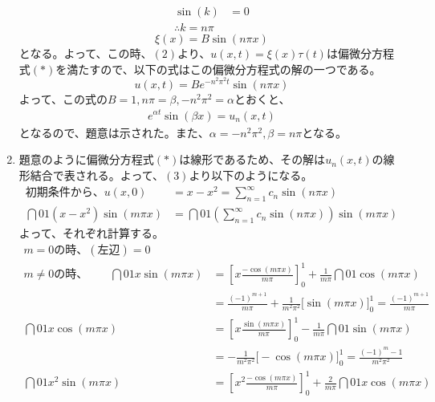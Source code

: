 \documentclass[dvipdfmx,titlepage, 11pt, a4paper]{jsarticle}%
\begin{document}
\begin{enumerate}[(1)]
        \begin{align*}
            \sin (k) &= 0\\
            \therefore k = n\pi
        \end{align*}
        \begin{equation*}
            \xi (x) = B\sin (n\pi x)
        \end{equation*}
        となる。よって、この時、$(2)$より、$u(x, t) = \xi (x)\tau (t)$は偏微分方程式$(*)$を満たすので、以下の式はこの偏微分方程式の解の一つである。
        \begin{equation*}
            u(x, t) = Be^{-n^2\pi^2t}\sin(n\pi x)
        \end{equation*}
        よって、この式の$B = 1, n\pi = \beta, -n^2\pi^2 = \alpha$とおくと、
        \begin{align*}
            e^{\alpha t}\sin(\beta x) = u_n(x, t)
        \end{align*}
        となるので、題意は示された。また、$\alpha = -n^2\pi^2, \beta = n\pi$となる。
    \item 題意のように偏微分方程式$(*)$は線形であるため、その解は$u_n(x, t)$の線形結合で表される。よって、$(3)$より以下のようになる。
    \begin{align*}
        初期条件から、u(x, 0) &= x - x^2 = \sum_{n = 1}^{\infty}c_n\sin(n\pi x)\\
        \dint{0}{1}{(x - x^2)\sin(m\pi x)} &= \dint{0}{1}{\left(\sum_{n = 1}^{\infty}c_n\sin(n\pi x)\right)\sin (m\pi x)}
    \end{align*}
    よって、それぞれ計算する。
    \begin{align*}
        m = 0の時、
        (左辺) = 0&\\
        m \neq 0の時、\qquad
        \dint{0}{1}{x\sin(m\pi x)} &= \left[x\frac{-\cos(m\pi x)}{m\pi}\right]_{0}^{1} + \frac{1}{m\pi}\dint{0}{1}{\cos(m\pi x)}\\
        &= \frac{(-1)^{m + 1}}{m\pi} + \frac{1}{m^2\pi^2}\bigl[\sin (m\pi x)\bigr]_{0}^{1} = \frac{(-1)^{m + 1}}{m\pi}\\
        \dint{0}{1}{x\cos(m\pi x)} &= \left[x\frac{\sin(m\pi x)}{m\pi}\right]_{0}^{1} - \frac{1}{m\pi}\dint{0}{1}{\sin(m\pi x)}\\
        &= -\frac{1}{m^2\pi^2}\bigl[-\cos (m\pi x)\bigr]_{0}^{1} = \frac{(-1)^{m} - 1}{m^2\pi^2}\\
        \dint{0}{1}{x^2\sin(m\pi x)} &= \left[x^2\frac{-\cos(m\pi x)}{m\pi}\right]_{0}^{1} + \frac{2}{m\pi}\dint{0}{1}{x\cos(m\pi x)}\\

\end{align*}
\end{enumerate}
\end{document}
